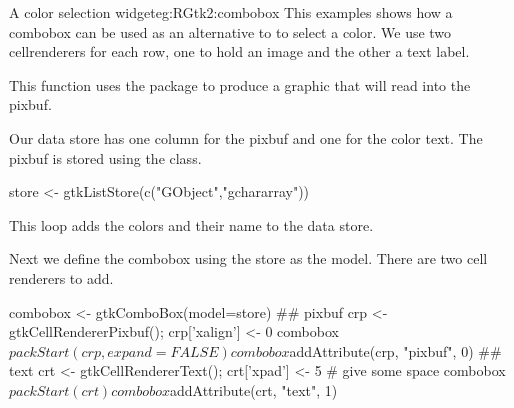 \begin{example}{A color selection widget}{eg:RGtk2:combobox}
This examples shows how a combobox can be used as an alternative to
 to select a color. We use two cellrenderers
for each row, one to hold an image and the other a text label.


This function uses the  package to produce a graphic that
will read into the pixbuf.

\begin{Schunk}
\end{Schunk}

Our data store has one column for the pixbuf and one for the color
text. The pixbuf is stored using the  class.

\begin{Schunk}
\begin{Sinput}
 store <- gtkListStore(c("GObject","gchararray"))
\end{Sinput}
\end{Schunk}

This loop adds the colors and their name to the data store.
\begin{Schunk}
\end{Schunk}

Next we define the combobox using the store as the model. There are
two cell renderers to add.
\begin{Schunk}
\begin{Sinput}
 combobox <- gtkComboBox(model=store)
 ## pixbuf
 crp <- gtkCellRendererPixbuf(); crp['xalign'] <- 0
 combobox$packStart(crp, expand=FALSE)                
 combobox$addAttribute(crp, "pixbuf", 0)
 ## text
 crt <- gtkCellRendererText(); 
 crt['xpad'] <- 5                        # give some space
 combobox$packStart(crt)
 combobox$addAttribute(crt, "text", 1)
\end{Sinput}
\end{Schunk}



\end{example}
